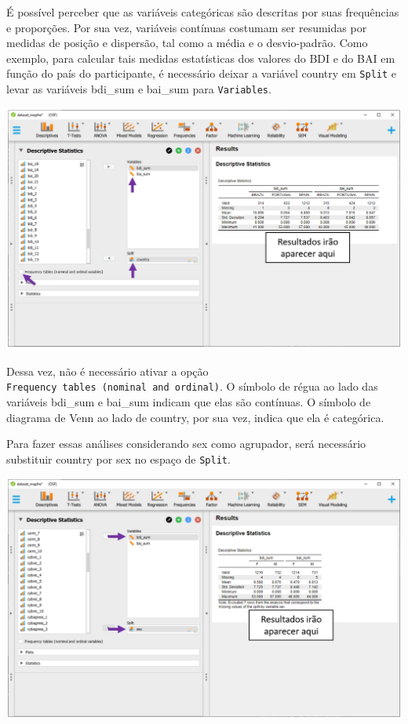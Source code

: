 \documentclass[
]{book}
\begin{document}
É possível perceber que as variáveis categóricas são descritas por suas
frequências e proporções. Por sua vez, variáveis contínuas costumam ser
resumidas por medidas de posição e dispersão, tal como a média e o
desvio-padrão. Como exemplo, para calcular tais medidas estatísticas dos
valores do BDI e do BAI em função do país do participante, é necessário
deixar a variável country em \texttt{Split} e levar as variáveis
bdi\_sum e bai\_sum para \texttt{Variables}.

\includegraphics{./img/cap_desc_jasp_proporcao_duas_variaveis_split2.png}

Dessa vez, não é necessário ativar a opção
\texttt{Frequency\ tables\ (nominal\ and\ ordinal)}. O símbolo de régua
ao lado das variáveis bdi\_sum e bai\_sum indicam que elas são
contínuas. O símbolo de diagrama de Venn ao lado de country, por sua
vez, indica que ela é categórica.

Para fazer essas análises considerando sex como agrupador, será
necessário substituir country por sex no espaço de \texttt{Split}.

\includegraphics{./img/cap_desc_jasp_proporcao_duas_variaveis_split3.png}
\end{document}
